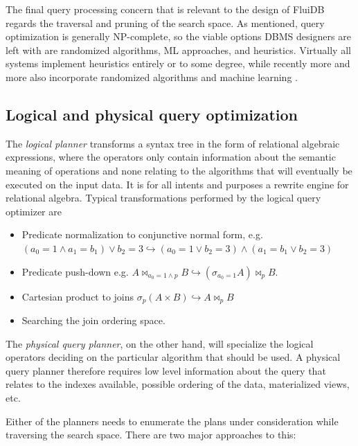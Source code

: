 The final query processing concern that is relevant to the design of
FluiDB regards the traversal and pruning of the search space. As
mentioned, query optimization is generally NP-complete, so the viable
options DBMS designers are left with are randomized algorithms, ML
approaches, and heuristics. Virtually all systems implement heuristics
entirely or to some degree, while recently more and more also
incorporate randomized algorithms
\cite{chandeGeneticOptimizationJoin2011} and machine learning
\cite{liMachineLearningDatabases2021,marcusNeoLearnedQuery2019}.

\subsection{Logical and physical query optimization}

The \emph{logical planner} transforms a syntax tree in the form of
relational algebraic expressions, where the operators only contain
information about the semantic meaning of operations and none relating
to the algorithms that will eventually be executed on the input
data. It is for all intents and purposes a rewrite engine for
relational algebra. Typical transformations performed by the logical
query optimizer are

\begin{itemize}
\item Predicate normalization to conjunctive normal form, e.g. \((a_0 = 1
  \land a_1 = b_1) \lor b_2 = 3 \hookrightarrow (a_0 = 1 \lor b_2 = 3)
  \land (a_1 = b_1 \lor b_2 = 3)\)
\item Predicate push-down e.g. \(A \Join_{a_0 = 1 \land p} B
  \hookrightarrow (\sigma_{a_0 = 1} A) \Join_p B\).
\item Cartesian product to joins \(\sigma_p ( A \times B )
  \hookrightarrow A \Join_p B\)
\item Searching the join ordering space.
\end{itemize}

The \emph{physical query planner}, on the other hand, will specialize
the logical operators deciding on the particular algorithm that should
be used. A physical query planner therefore requires low level
information about the query that relates to the indexes available,
possible ordering of the data, materialized views, etc.

Either of the planners needs to enumerate the plans under
consideration while traversing the search space. There are two major
approaches to this:

